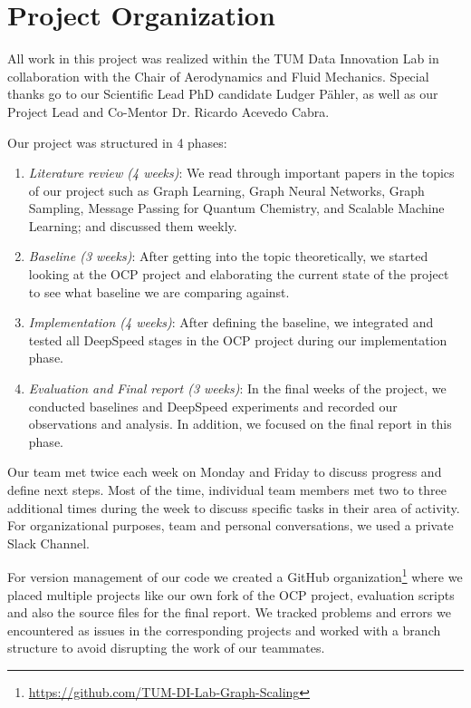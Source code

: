 \section{Project Organization}
\label{section:project_organization}

All work in this project was realized within the TUM Data Innovation Lab in collaboration with the Chair of 
Aerodynamics and Fluid Mechanics. Special thanks go to our Scientific Lead PhD candidate Ludger P\"ahler, 
as well as our Project Lead and Co-Mentor Dr. Ricardo Acevedo Cabra.

Our project was structured in 4 phases:

\begin{enumerate}
    \item \textit{Literature review (4 weeks)}: We read through important papers in the topics of our project such 
    as Graph Learning, Graph Neural Networks, Graph Sampling, Message Passing for Quantum Chemistry, 
    and Scalable Machine Learning; and discussed them weekly.
    \item \textit{Baseline (3 weeks)}: After getting into the topic theoretically, we started looking at the OCP 
    project and elaborating the current state of the project to see what baseline we are comparing against.
    \item \textit{Implementation (4 weeks)}: After defining the baseline, we integrated and tested all DeepSpeed 
    stages in the OCP project during our implementation phase.
    \item \textit{Evaluation and Final report (3 weeks)}: In the final weeks of the project, we conducted baselines 
    and DeepSpeed experiments and recorded our observations and analysis. In addition, we focused on the final 
    report in this phase.
\end{enumerate}

Our team met twice each week on Monday and Friday to discuss progress and define next steps. Most of 
the time, individual team members met two to three additional times during the week to discuss specific 
tasks in their area of activity. For organizational purposes, team and personal conversations, we used 
a private Slack Channel.

For version management of our code we created a GitHub organization\footnote{\url{https://github.com/TUM-DI-Lab-Graph-Scaling}} 
where we placed multiple projects like our own fork of the OCP project, evaluation scripts and also 
the source files for the final report. We tracked problems and errors we encountered as issues in the 
corresponding projects and worked with a branch structure to avoid disrupting the work of our teammates.